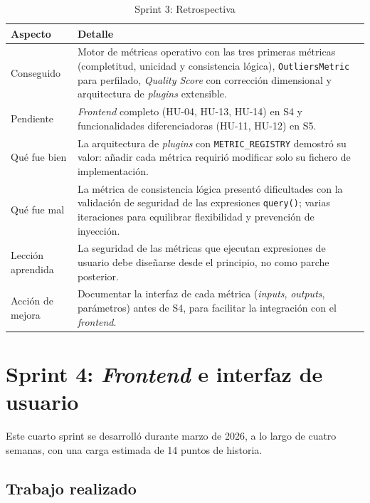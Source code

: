 \begin{table}[htbp]
  \centering
  \small
  \caption{Sprint 3: Retrospectiva}
  \label{tab:sprint3-retro}
  \begin{tabularx}{\textwidth}{l X}
    \toprule
    \textbf{Aspecto} & \textbf{Detalle} \\
    \midrule
    Conseguido & Motor de métricas operativo con las tres primeras métricas
      (completitud, unicidad y consistencia lógica), \texttt{OutliersMetric}
      para perfilado, \emph{Quality Score} con corrección dimensional y
      arquitectura de \emph{plugins} extensible. \\
    Pendiente & \emph{Frontend} completo (HU-04, HU-13, HU-14) en S4 y
      funcionalidades diferenciadoras (HU-11, HU-12) en S5. \\
    Qué fue bien & La arquitectura de \emph{plugins} con
      \texttt{METRIC\_REGISTRY} demostró su valor: añadir cada métrica requirió
      modificar solo su fichero de implementación. \\
    Qué fue mal & La métrica de consistencia lógica presentó dificultades con
      la validación de seguridad de las expresiones \texttt{query()}; varias
      iteraciones para equilibrar flexibilidad y prevención de inyección. \\
    Lección aprendida & La seguridad de las métricas que ejecutan expresiones
      de usuario debe diseñarse desde el principio, no como parche posterior. \\
    Acción de mejora & Documentar la interfaz de cada métrica (\emph{inputs},
      \emph{outputs}, parámetros) antes de S4, para facilitar la integración
      con el \emph{frontend}. \\
    \bottomrule
  \end{tabularx}
\end{table}


\section{Sprint 4: \emph{Frontend} e interfaz de usuario}
\label{sec:sprint4}
Este cuarto sprint se desarrolló durante marzo de 2026, a lo largo de cuatro
semanas, con una carga estimada de 14 puntos de historia.

\subsection{Trabajo realizado}

